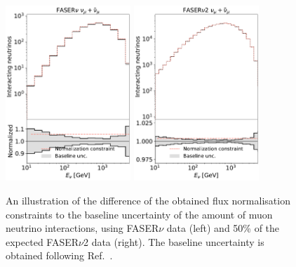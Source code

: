 \begin{figure}[t]
\centering
\includegraphics[width=0.42\textwidth]{plots/proton_fasernu2/FASERv2_flux_run3/normalization_constraint_run3.pdf}
\includegraphics[width=0.42\textwidth]{plots/proton_fasernu2/FASERv2_flux_HL-LHC/normalization_constraint_HL-LHC.pdf}
\caption{
  An illustration of the difference of the obtained flux normalisation constraints to the baseline uncertainty of the amount of muon neutrino interactions, using FASER$\nu$ data (left) and 50\% of the expected FASER$\nu$2 data (right). The baseline uncertainty is obtained following Ref.~\cite{Kling:2023tgr}.
}
\label{fig:flux_constraints}
\end{figure}
